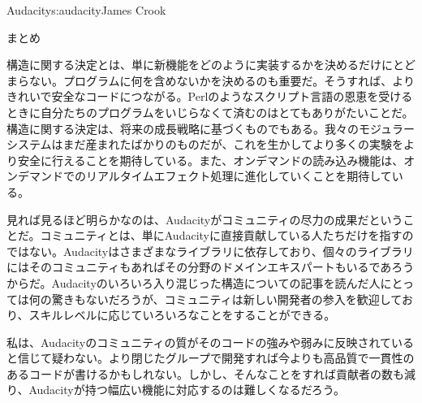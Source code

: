 \begin{aosachapter}{Audacity}{s:audacity}{James Crook}
\begin{aosasect1}{まとめ}
\begin{aosaitemize}
\item 構造に関する決定とは、単に新機能をどのように実装するかを決めるだけにとどまらない。プログラムに何を含めないかを決めるのも重要だ。そうすれば、よりきれいで安全なコードにつながる。Perlのようなスクリプト言語の恩恵を受けるときに自分たちのプログラムをいじらなくて済むのはとてもありがたいことだ。構造に関する決定は、将来の成長戦略に基づくものでもある。我々のモジュラーシステムはまだ産まれたばかりのものだが、これを生かしてより多くの実験をより安全に行えることを期待している。また、オンデマンドの読み込み機能は、オンデマンドでのリアルタイムエフェクト処理に進化していくことを期待している。

\end{aosaitemize}

見れば見るほど明らかなのは、Audacityがコミュニティの尽力の成果だということだ。コミュニティとは、単にAudacityに直接貢献している人たちだけを指すのではない。Audacityはさまざまなライブラリに依存しており、個々のライブラリにはそのコミュニティもあればその分野のドメインエキスパートもいるであろうからだ。Audacityのいろいろ入り混じった構造についての記事を読んだ人にとっては何の驚きもないだろうが、コミュニティは新しい開発者の参入を歓迎しており、スキルレベルに応じていろいろなことをすることができる。

私は、Audacityのコミュニティの質がそのコードの強みや弱みに反映されていると信じて疑わない。より閉じたグループで開発すれば今よりも高品質で一貫性のあるコードが書けるかもしれない。しかし、そんなことをすれば貢献者の数も減り、Audacityが持つ幅広い機能に対応するのは難しくなるだろう。

\end{aosasect1}

\end{aosachapter}
